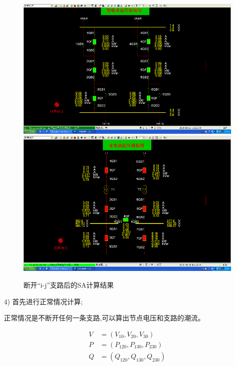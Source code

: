 \documentclass[a4paper]{ctexrep}
\begin{document}
                    \begin{figure}[htbp]
                        \centering
                        \includegraphics[width=12cm]{9.png} 
                        \includegraphics[width=12cm]{10.png}
                        \caption{断开“i-j”支路后的SA计算结果}
                    \end{figure}

                    4) 首先进行正常情况计算;

                    正常情况是不断开任何一条支路,可以算出节点电压和支路的潮流。

                    \begin{equation}
                        \begin{aligned}
                            V & = (V_{10},V_{20},V_{30}) \\
                            P & = (P_{120},P_{130},P_{230}) \\
                            Q & = (Q_{120},Q_{130},Q_{230}) 
                        \end{aligned}
                    \end{equation}
\end{document}
